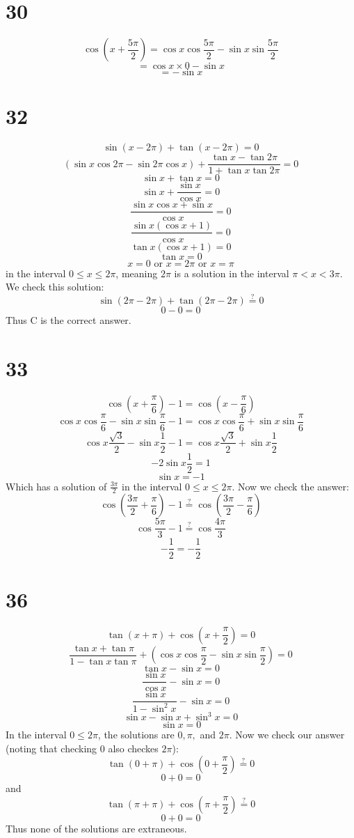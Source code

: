 \documentclass{article}
\theoremstyle{definition}
\newcommand{\?}{\stackrel{?}{=}}
\begin{document}
\section*{30}
\[ \cos(x+\frac{5\pi}{2})=\cos x\cos\frac{5\pi}{2}-\sin x\sin\frac{5\pi}{2} \]
\[ =\cos x\times 0-\sin x \]
\[ =-\sin x \]

\section*{32}
\[ \sin(x-2\pi)+\tan (x-2\pi)=0 \]
\[ (\sin x\cos 2\pi-\sin 2\pi\cos x)+\frac{\tan x-\tan 2\pi}{1+\tan x\tan 2\pi}=0 \]
\[ \sin x+\tan x=0 \]
\[ \sin x+\frac{\sin x}{\cos x}=0 \]
\[ \frac{\sin x\cos x+\sin x}{\cos x}=0 \]
\[ \frac{\sin x(\cos x+1)}{\cos x}=0 \]
\[ \tan x(\cos x+1)=0 \]
\[ \tan x=0 \]
\[ x=0\textrm{ or }x=2\pi\textrm{ or }x=\pi \] in the interval $0\le x\le 2\pi$, meaning $2\pi$ is a solution in the interval $\pi<x<3\pi$. We check this solution:
\[ \sin(2\pi-2\pi)+\tan(2\pi-2\pi)\? 0 \]
\[ 0-0=0 \] 
Thus C is the correct answer.

\section*{33}
\[ \cos(x+\frac{\pi}{6})-1=\cos(x-\frac{\pi}{6}) \]
\[ \cos x\cos\frac{\pi}{6}-\sin x\sin\frac{\pi}{6}-1=\cos x\cos\frac{\pi}{6}+\sin x\sin\frac{\pi}{6} \]
\[ \cos x\frac{\sqrt{3}}{2}-\sin x\frac{1}{2}-1=\cos x\frac{\sqrt{3}}{2}+\sin x\frac{1}{2} \]
\[ -2\sin x\frac{1}{2}=1 \]
\[ \sin x=-1 \]
Which has a solution of $\frac{3\pi}{2}$ in the interval $0\le x\le 2\pi$. Now we check the answer:
\[ \cos(\frac{3\pi}{2}+\frac{\pi}{6})-1\?\cos(\frac{3\pi}{2}-\frac{\pi}{6}) \]
\[ \cos\frac{5\pi}{3}-1\?\cos\frac{4\pi}{3} \]
\[ -\frac{1}{2}=-\frac{1}{2} \]

\section*{36}
\[ \tan(x+\pi)+\cos(x+\frac{\pi}{2})=0 \]
\[ \frac{\tan x+\tan\pi}{1-\tan x\tan\pi}+(\cos x\cos\frac{\pi}{2}-\sin x\sin\frac{\pi}{2})=0 \]
\[ \tan x-\sin x=0 \]
\[ \frac{\sin x}{\cos x}-\sin x=0 \]
\[ \frac{\sin x}{1-\sin^2 x}-\sin x=0 \]
\[ \sin x-\sin x+\sin^3 x=0 \]
\[ \sin x=0 \]
In the interval $0\le 2\pi$, the solutions are $0,\pi,$ and $2\pi$.
Now we check our answer (noting that checking $0$ also checkes $2\pi$):
\[ \tan(0+\pi)+\cos(0+\frac{\pi}{2})\? 0 \]
\[ 0+0=0 \]
and
\[ \tan(\pi+\pi)+\cos(\pi+\frac{\pi}{2})\? 0 \]
\[ 0+0=0 \]
Thus none of the solutions are extraneous.
\end{document}
